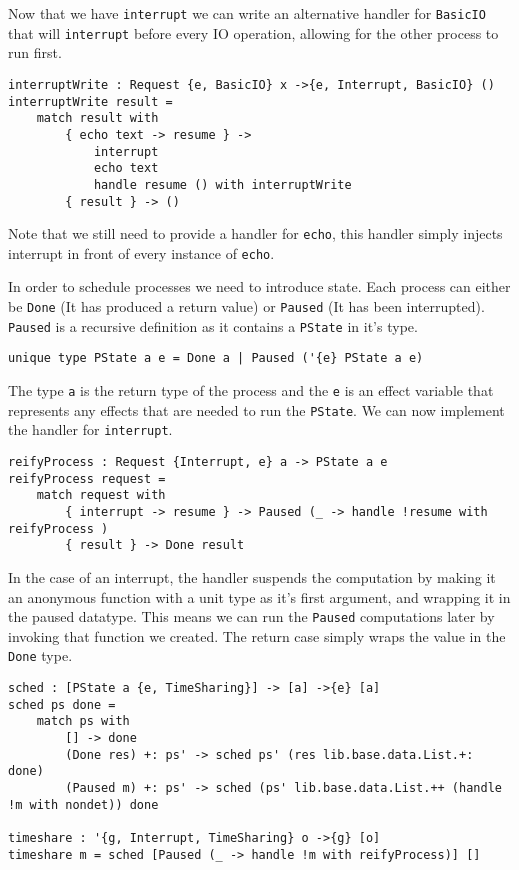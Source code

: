 \documentclass[logo,bsc,singlespacing,parskip]{infthesis}
\begin{document}
Now that we have \texttt{interrupt} we can write an alternative handler for
\texttt{BasicIO} that will \texttt{interrupt} before every IO operation,
allowing for the other process to run first.

\begin{lstlisting}[language=unison]
interruptWrite : Request {e, BasicIO} x ->{e, Interrupt, BasicIO} ()
interruptWrite result =
    match result with
        { echo text -> resume } -> 
            interrupt
            echo text 
            handle resume () with interruptWrite
        { result } -> ()
\end{lstlisting}

Note that we still need to provide a handler for \texttt{echo}, this handler
simply injects interrupt in front of every instance of \texttt{echo}.

In order to schedule processes we need to introduce state. Each process can either be \texttt{Done} (It has produced a return value) or \texttt{Paused} (It has been interrupted). \texttt{Paused} is a recursive definition as it contains a \texttt{PState} in it's type.

\begin{lstlisting}[language=unison]
unique type PState a e = Done a | Paused ('{e} PState a e)
\end{lstlisting}

The type \texttt{a} is the return type of the process and the \texttt{e} is an
effect variable that represents any effects that are needed to run the
\texttt{PState}. We can now implement the handler for \texttt{interrupt}.

\begin{lstlisting}[language=unison]
reifyProcess : Request {Interrupt, e} a -> PState a e
reifyProcess request =
    match request with
        { interrupt -> resume } -> Paused (_ -> handle !resume with reifyProcess )
        { result } -> Done result
\end{lstlisting}

In the case of an interrupt, the handler suspends the computation by making it
an anonymous function with a unit type as it's first argument, and wrapping it
in the paused datatype. This means we can run the \texttt{Paused} computations
later by invoking that function we created. The return case simply wraps the
value in the \texttt{Done} type.

\begin{lstlisting}[language=unison]
sched : [PState a {e, TimeSharing}] -> [a] ->{e} [a]
sched ps done = 
    match ps with
        [] -> done
        (Done res) +: ps' -> sched ps' (res lib.base.data.List.+: done)
        (Paused m) +: ps' -> sched (ps' lib.base.data.List.++ (handle !m with nondet)) done

timeshare : '{g, Interrupt, TimeSharing} o ->{g} [o]
timeshare m = sched [Paused (_ -> handle !m with reifyProcess)] []
\end{lstlisting}
\end{document}
